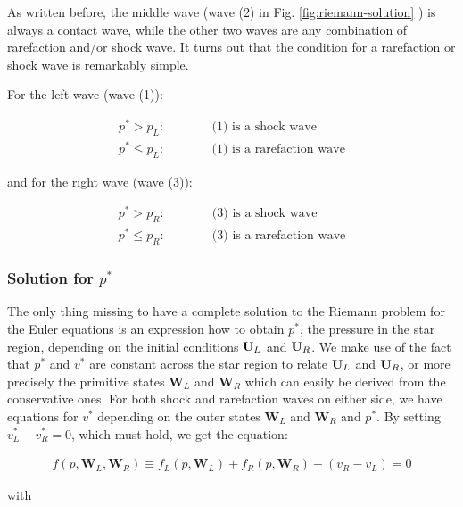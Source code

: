 As written before, the middle wave (wave (2) in Fig. \ref{fig:riemann-solution}
) is always a contact wave, while the other two waves are any combination of
rarefaction and/or shock wave. It turns out that the condition for a
rarefaction or shock wave is remarkably simple.

For the left wave (wave (1)):

\begin{align}
	p^* > p_L: && &\quad \text{ (1) is a shock wave}\\
	p^* \leq p_L: && &\quad \text{ (1) is a rarefaction wave}
\end{align}

and for the right wave (wave (3)):

\begin{align}
	p^* > p_R: && & \quad \text{ (3) is a shock wave} \\
	p^* \leq p_R: && & \quad \text{ (3) is a rarefaction wave} 
\end{align}










\subsubsection{Solution for $p^*$}

The only thing missing to have a complete solution to the Riemann problem for
the Euler equations is an expression how to obtain $p^*$, the pressure in the
star region, depending on the initial conditions $\mathbf{U}_L$ and $\mathbf{U}_R$. We make use
of the fact that $p^*$ and $v^*$ are constant across the star region to relate
$\mathbf{U}_L$ and $\mathbf{U}_R$, or more precisely the primitive states $\mathbf{W}_L$ and
$\mathbf{W}_R$ which can easily be derived from the conservative ones.
For both shock and rarefaction waves on either side, we have equations for
$v^*$ depending on the outer states  $\mathbf{W}_L$ and $\mathbf{W}_R$ and
$p^*$. By setting $v^*_L - v^*_R = 0$, which must hold, we get the equation:

\begin{align}
f(p, \mathbf{W}_L, \mathbf{W}_R)
	\equiv f_L(p, \mathbf{W}_L) + f_R(p, \mathbf{W}_R) + (v_R - v_L)
	= 0
\label{eq:riemann-pressure-equation}
\end{align}

with 

